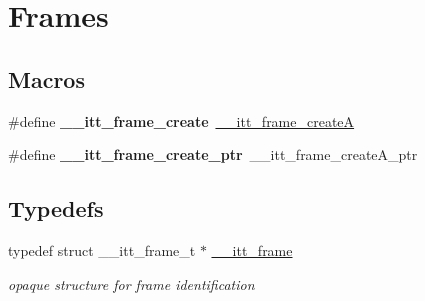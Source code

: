 \hypertarget{group__frames}{}\section{Frames}
\label{group__frames}
\subsection*{Macros}
\begin{DoxyCompactItemize}
\item 
\hypertarget{group__frames_ga0f3e51aaf74b13975eec5f29533cc442}{}\#define {\bfseries \+\_\+\+\_\+itt\+\_\+frame\+\_\+create}~\hyperlink{group__frames_ga8b106f002c9f1ed6e17d5833e8200ff0}{\+\_\+\+\_\+itt\+\_\+frame\+\_\+create\+A}\label{group__frames_ga0f3e51aaf74b13975eec5f29533cc442}

\item 
\hypertarget{group__frames_ga45e4c9f633e550e222d510aef5616283}{}\#define {\bfseries \+\_\+\+\_\+itt\+\_\+frame\+\_\+create\+\_\+ptr}~\+\_\+\+\_\+itt\+\_\+frame\+\_\+create\+A\+\_\+ptr\label{group__frames_ga45e4c9f633e550e222d510aef5616283}

\end{DoxyCompactItemize}
\subsection*{Typedefs}
\begin{DoxyCompactItemize}
\item 
\hypertarget{group__frames_gad1b74516ce88dc28bff032244625c7c2}{}typedef struct \+\_\+\+\_\+itt\+\_\+frame\+\_\+t $\ast$ \hyperlink{group__frames_gad1b74516ce88dc28bff032244625c7c2}{\+\_\+\+\_\+itt\+\_\+frame}\label{group__frames_gad1b74516ce88dc28bff032244625c7c2}

\begin{DoxyCompactList}\small\item\em opaque structure for frame identification \end{DoxyCompactList}\end{DoxyCompactItemize}
